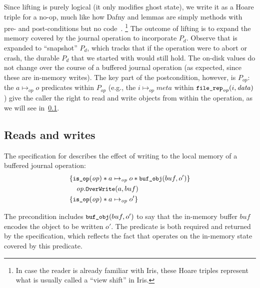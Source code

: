 Since lifting is purely logical (it only modifies ghost state), we
write it as a Hoare triple for a no-op, much like how Dafny and \fstar lemmas
are simply methods with pre- and post-conditions but no code~\cite[\S 12.2.3]{dafny-refman}.%
\footnote{In case the reader is already familiar with Iris, these Hoare triples represent
what is usually called a ``view shift'' in Iris.}
The outcome of lifting is to expand the memory covered by the journal operation to
incorporate $P_{d}$. Observe that \bufobjDurable is expanded to ``snapshot''
$P_{d}$, which tracks that if the operation were to abort or crash, the
durable $P_d$ that we started with would still hold.  The on-disk values
do not change over the course of a buffered journal operation (as expected, since these are
in-memory writes). The key part of the postcondition, however, is $P_{op}$: the
$a \mapsto_{op} o$ predicates within $P_{op}$ (e.g., the
$i \mapsto_{\mathit{op}} \mathit{meta}$ within $\cc{file_rep}_{\mathit{op}}(i, \mathit{data})$)
give the caller
the right to read and write objects from within the operation, as we will see
in~\cref{s:design:read-write}.


\subsection{Reads and writes}
\label{s:design:read-write}

The specification for  describes the effect of writing to the
local memory of a buffered journal operation:
%
\begin{align*}
  \hoareV{\cc{is_op}(\mathit{op}) \sep a \mapsto_{\mathit{op}} o \sep \cc{buf_obj}(buf, o')}%
        {\mathit{op}.\cc{OverWrite}(a, buf)}%
        {\cc{is_op}(\mathit{op}) \sep a \mapsto_{\mathit{op}} o'}
\end{align*}

The precondition includes $\cc{buf_obj}(buf, o')$ to say that the in-memory
buffer $buf$ encodes the object to be written $o'$.
The  predicate is both
required and returned by the specification, which reflects the fact that
 operates on the in-memory state covered by
this predicate.

